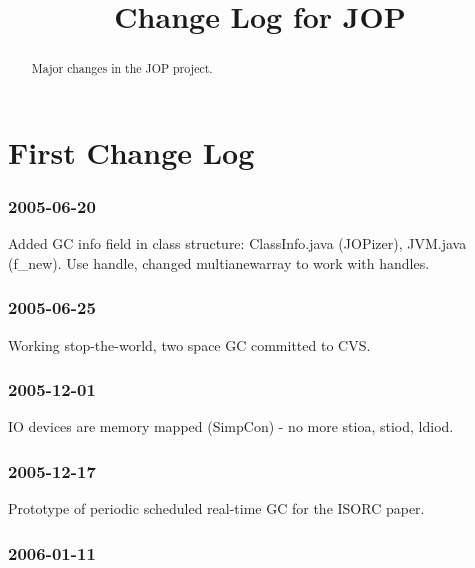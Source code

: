 \documentclass[a4paper,12pt]{scrartcl}
\begin{document}
\title{Change Log for JOP}
\maketitle \thispagestyle{empty}

\begin{abstract}

Major changes in the JOP project.

\end{abstract}


\section{First Change Log}

\subsubsection*{2005-06-20}

Added GC info field in class structure: ClassInfo.java (JOPizer),
JVM.java (f\_new). Use handle, changed multianewarray to work with
handles.

\subsubsection*{2005-06-25}

Working stop-the-world, two space GC committed to CVS.



\subsubsection*{2005-12-01}

IO devices are memory mapped (SimpCon) - no more stioa, stiod,
ldiod.

\subsubsection*{2005-12-17}

Prototype of periodic scheduled real-time GC for the ISORC paper.

\subsubsection*{2006-01-11}
\end{document}
